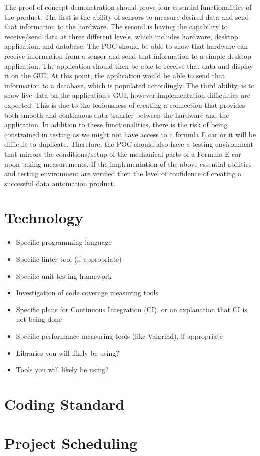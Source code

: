 \documentclass{article}
\begin{document}
The proof of concept demonstration should prove four essential 
functionalities of the product. The first is the ability of sensors to measure 
desired data and send that information to the hardware. The second is having the capability to receive/send 
data at three different levels, which includes hardware, desktop application, and database. 
The POC should be able to show that hardware can receive information from a sensor and send that 
information to a simple desktop application. The application should then be able to receive that 
data and display it on the GUI. At this point, the application would be able to send that 
information to a database, which is populated accordingly. The third ability, 
is to show live data on the application’s GUI, however implementation difficulties are expected. 
This is due to the tediousness of creating a connection that provides both smooth and continuous 
data transfer between the hardware and the application. In addition to these functionalities, there 
is the risk of being constrained in testing as we might not have access to a formula E car or it will 
be difficult to duplicate. Therefore, the POC should also have a testing environment that mirrors the 
conditions/setup of the mechanical parts of a Formula E car upon taking measurements. If the implementation of 
the above essential abilities and testing environment are verified then the level of confidence of creating 
a successful data automation product. 

\section{Technology}

\begin{itemize}
\item Specific programming language
\item Specific linter tool (if appropriate)
\item Specific unit testing framework
\item Investigation of code coverage measuring tools
\item Specific plans for Continuous Integration (CI), or an explanation that CI
  is not being done
\item Specific performance measuring tools (like Valgrind), if
  appropriate
\item Libraries you will likely be using?
\item Tools you will likely be using?
\end{itemize}

\section{Coding Standard}

\section{Project Scheduling}

\end{document}
